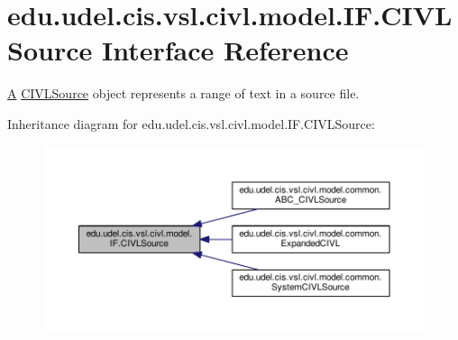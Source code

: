 \hypertarget{interfaceedu_1_1udel_1_1cis_1_1vsl_1_1civl_1_1model_1_1IF_1_1CIVLSource}{}\section{edu.\+udel.\+cis.\+vsl.\+civl.\+model.\+I\+F.\+C\+I\+V\+L\+Source Interface Reference}
\label{interfaceedu_1_1udel_1_1cis_1_1vsl_1_1civl_1_1model_1_1IF_1_1CIVLSource}


\hyperlink{structA}{A} \hyperlink{interfaceedu_1_1udel_1_1cis_1_1vsl_1_1civl_1_1model_1_1IF_1_1CIVLSource}{C\+I\+V\+L\+Source} object represents a range of text in a source file.  




Inheritance diagram for edu.\+udel.\+cis.\+vsl.\+civl.\+model.\+I\+F.\+C\+I\+V\+L\+Source\+:
\nopagebreak
\begin{figure}[H]
\begin{center}
\leavevmode
\includegraphics[width=350pt]{interfaceedu_1_1udel_1_1cis_1_1vsl_1_1civl_1_1model_1_1IF_1_1CIVLSource__inherit__graph}
\end{center}
\end{figure}
